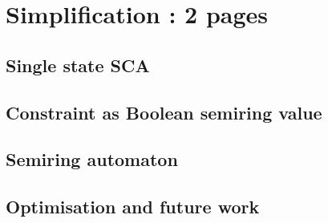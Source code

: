 \section{Simplification : 2 pages}
\subsection*{Single state SCA}
\subsection*{Constraint as Boolean semiring value}
\subsection*{Semiring automaton}
\subsection*{Optimisation and future work}